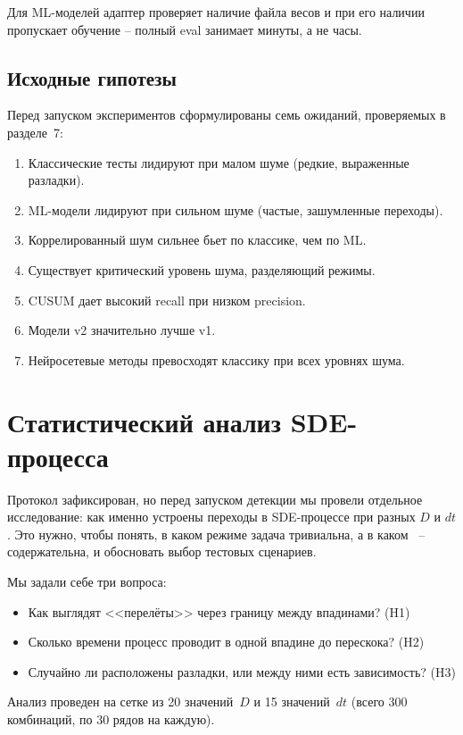 \documentclass[12pt,a4paper]{article}
\begin{document}
Для ML-моделей адаптер проверяет наличие файла весов и при его наличии пропускает обучение  -- полный eval занимает минуты, а не часы.

\subsection{Исходные гипотезы}

Перед запуском экспериментов сформулированы семь ожиданий, проверяемых в разделе~7:

\begin{enumerate}
    \item Классические тесты лидируют при малом шуме (редкие, выраженные разладки).
    \item ML-модели лидируют при сильном шуме (частые, зашумленные переходы).
    \item Коррелированный шум сильнее бьет по классике, чем по ML.
    \item Существует критический уровень шума, разделяющий режимы.
    \item CUSUM дает высокий recall при низком precision.
    \item Модели v2 значительно лучше v1.
    \item Нейросетевые методы превосходят классику при всех уровнях шума.
\end{enumerate}

\section{Статистический анализ SDE-процесса}

Протокол зафиксирован, но перед запуском детекции мы провели отдельное исследование: как именно устроены переходы в SDE-процессе при разных $D$ и $dt$. Это нужно, чтобы понять, в каком режиме задача тривиальна, а в каком~ -- содержательна, и обосновать выбор тестовых сценариев.

Мы задали себе три вопроса:
\begin{itemize}
    \item Как выглядят <<перелёты>> через границу между впадинами? (H1)
    \item Сколько времени процесс проводит в одной впадине до перескока? (H2)
    \item Случайно ли расположены разладки, или между ними есть зависимость? (H3)
\end{itemize}

\noindent Анализ проведен на сетке из 20 значений~$D$ и 15 значений~$dt$ (всего 300 комбинаций, по 30 рядов на каждую).
\end{document}
